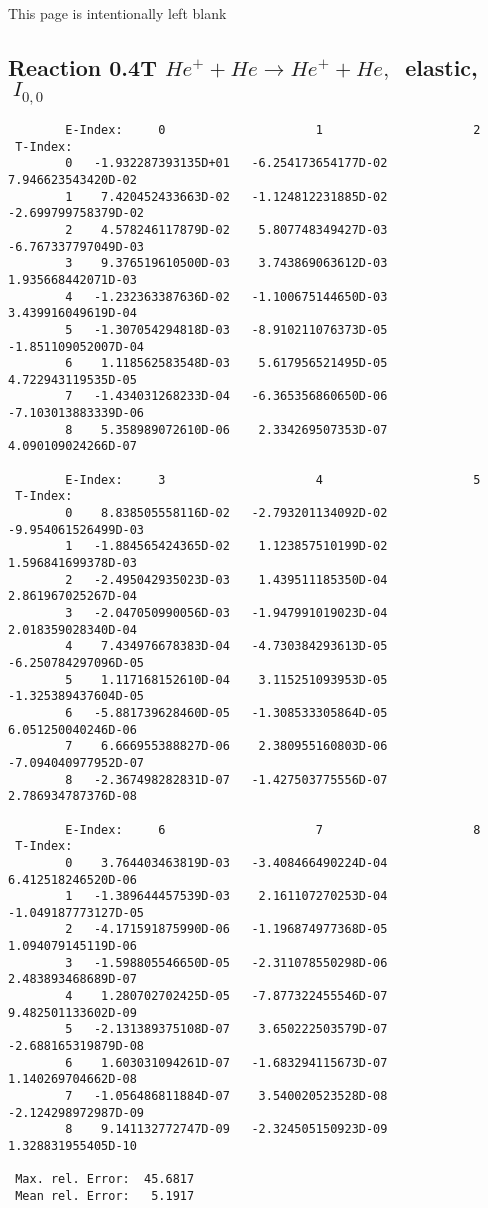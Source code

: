 \documentclass[12pt]{article}
\begin{document}
\newpage
This page is intentionally left blank
\newpage


\subsection{
Reaction 0.4T  $He^+ + He \rightarrow He^+ + He ,\ $
 elastic, $\  I_{0,0}$
}

\begin{small}\begin{verbatim}
        E-Index:     0                     1                     2
 T-Index:
        0   -1.932287393135D+01   -6.254173654177D-02    7.946623543420D-02
        1    7.420452433663D-02   -1.124812231885D-02   -2.699799758379D-02
        2    4.578246117879D-02    5.807748349427D-03   -6.767337797049D-03
        3    9.376519610500D-03    3.743869063612D-03    1.935668442071D-03
        4   -1.232363387636D-02   -1.100675144650D-03    3.439916049619D-04
        5   -1.307054294818D-03   -8.910211076373D-05   -1.851109052007D-04
        6    1.118562583548D-03    5.617956521495D-05    4.722943119535D-05
        7   -1.434031268233D-04   -6.365356860650D-06   -7.103013883339D-06
        8    5.358989072610D-06    2.334269507353D-07    4.090109024266D-07

        E-Index:     3                     4                     5
 T-Index:
        0    8.838505558116D-02   -2.793201134092D-02   -9.954061526499D-03
        1   -1.884565424365D-02    1.123857510199D-02    1.596841699378D-03
        2   -2.495042935023D-03    1.439511185350D-04    2.861967025267D-04
        3   -2.047050990056D-03   -1.947991019023D-04    2.018359028340D-04
        4    7.434976678383D-04   -4.730384293613D-05   -6.250784297096D-05
        5    1.117168152610D-04    3.115251093953D-05   -1.325389437604D-05
        6   -5.881739628460D-05   -1.308533305864D-05    6.051250040246D-06
        7    6.666955388827D-06    2.380955160803D-06   -7.094040977952D-07
        8   -2.367498282831D-07   -1.427503775556D-07    2.786934787376D-08

        E-Index:     6                     7                     8
 T-Index:
        0    3.764403463819D-03   -3.408466490224D-04    6.412518246520D-06
        1   -1.389644457539D-03    2.161107270253D-04   -1.049187773127D-05
        2   -4.171591875990D-06   -1.196874977368D-05    1.094079145119D-06
        3   -1.598805546650D-05   -2.311078550298D-06    2.483893468689D-07
        4    1.280702702425D-05   -7.877322455546D-07    9.482501133602D-09
        5   -2.131389375108D-07    3.650222503579D-07   -2.688165319879D-08
        6    1.603031094261D-07   -1.683294115673D-07    1.140269704662D-08
        7   -1.056486811884D-07    3.540020523528D-08   -2.124298972987D-09
        8    9.141132772747D-09   -2.324505150923D-09    1.328831955405D-10

 Max. rel. Error:  45.6817
 Mean rel. Error:   5.1917
\end{verbatim}\end{small}
\end{document}
